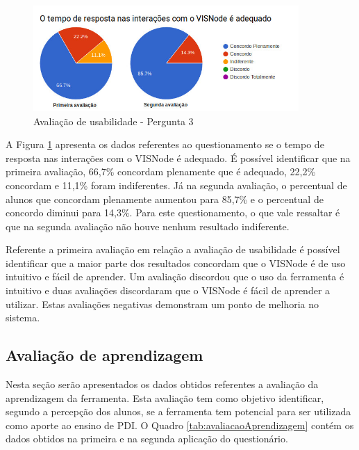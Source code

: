 \documentclass[
	12pt,				%
	oneside,			%
	a4paper,			%
	english,			%
	french,				%
	spanish,			%
	brazil,				%
	]{abntex2}
\begin{document}
\begin{figure}[H]
\centering
\caption{Avaliação de usabilidade - Pergunta 3}\label{fig:avaliacaoUsabilidade3}
\includegraphics[width=0.9\textwidth]{imagens/avaliacoes/avaliacao_usabilidade_3.jpg}
\sourceAuthor
\end{figure}

A Figura \ref{fig:avaliacaoUsabilidade3} apresenta os dados referentes ao questionamento se o tempo de resposta nas interações com o VISNode é adequado. É possível identificar que na primeira avaliação, 66,7\%  concordam plenamente que é adequado, 22,2\% concordam e 11,1\% foram indiferentes. Já na segunda avaliação, o percentual de alunos que concordam plenamente aumentou para 85,7\% e o percentual de concordo diminui para 14,3\%. Para este questionamento, o que vale ressaltar é que na segunda avaliação não houve nenhum resultado indiferente.

Referente a primeira avaliação em relação a avaliação de usabilidade é possível identificar que a maior parte dos resultados concordam que o VISNode é de uso intuitivo e fácil de aprender. Um avaliação discordou que o uso da ferramenta é intuitivo e duas avaliações discordaram que o VISNode é fácil de aprender a utilizar. Estas avaliações negativas demonstram um ponto de melhoria no sistema.

\subsection{Avaliação de aprendizagem}

Nesta seção serão apresentados os dados obtidos referentes a avaliação da aprendizagem da ferramenta. Esta avaliação tem como objetivo identificar, segundo a percepção dos alunos, se a ferramenta tem potencial para ser utilizada como aporte ao ensino de PDI. O Quadro \ref{tab:avaliacaoAprendizagem} contém os dados obtidos na primeira e na segunda aplicação do questionário. 
\end{document}
